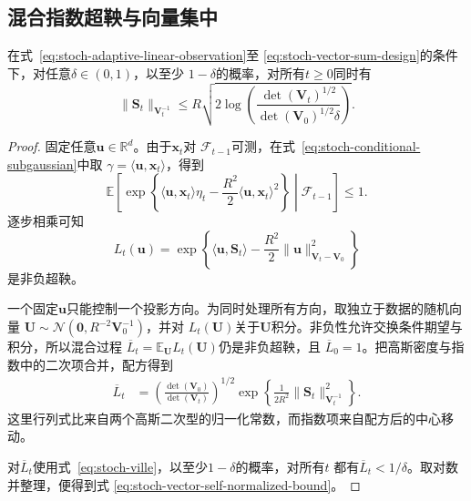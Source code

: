 \subsection{混合指数超鞅与向量集中}

\begin{theorem}[向量自归一化集中界]
  \label{thm:stoch-vector-self-normalized}
  在式~\eqref{eq:stoch-adaptive-linear-observation}至
  \eqref{eq:stoch-vector-sum-design}的条件下，对任意$\delta\in(0,1)$，以至少
  $1-\delta$的概率，对所有$t\geq0$同时有
  \begin{equation}
    \lVert\bm{S}_t\rVert_{\bm{V}_t^{-1}}
    \leq
    R\sqrt{
      2\log\left(
        \frac{\det(\bm{V}_t)^{1/2}}
             {\det(\bm{V}_0)^{1/2}\delta}
      \right)
    }.
    \label{eq:stoch-vector-self-normalized-bound}
  \end{equation}
\end{theorem}

\begin{proof}
固定任意$\bm{u}\in\mathbb{R}^d$。由于$\bm{x}_t$对
$\mathcal{F}_{t-1}$可测，在式~\eqref{eq:stoch-conditional-subgaussian}中取
$\gamma=\langle\bm{u},\bm{x}_t\rangle$，得到
\[
  \mathbb{E}\!\left[
    \exp\left\{
      \langle\bm{u},\bm{x}_t\rangle\eta_t
      -\frac{R^2}{2}
       \langle\bm{u},\bm{x}_t\rangle^2
    \right\}
    \middle|\mathcal{F}_{t-1}
  \right]
  \leq1.
  \]
逐步相乘可知
\[
  L_t(\bm{u})
  =
  \exp\left\{
    \langle\bm{u},\bm{S}_t\rangle
    -\frac{R^2}{2}
     \lVert\bm{u}\rVert_{\bm{V}_t-\bm{V}_0}^2
  \right\}
\]
是非负超鞅。

一个固定$\bm{u}$只能控制一个投影方向。为同时处理所有方向，取独立于数据的随机向量
$\bm{U}\sim\mathcal{N}(\bm{0},R^{-2}\bm{V}_0^{-1})$，并对
$L_t(\bm{U})$关于$\bm{U}$积分。非负性允许交换条件期望与积分，所以混合过程
$\overline L_t=\mathbb{E}_{\bm{U}}L_t(\bm{U})$仍是非负超鞅，且
$\overline L_0=1$。把高斯密度与指数中的二次项合并，配方得到
\begin{align*}
  \overline L_t
  &=
  \left(
    \frac{\det(\bm{V}_0)}
         {\det(\bm{V}_t)}
  \right)^{1/2}
  \exp\left\{
    \frac{1}{2R^2}
    \lVert\bm{S}_t\rVert_{\bm{V}_t^{-1}}^2
  \right\}.
\end{align*}
这里行列式比来自两个高斯二次型的归一化常数，而指数项来自配方后的中心移动。

对$\overline L_t$使用式~\eqref{eq:stoch-ville}，以至少$1-\delta$的概率，对所有$t$
都有$\overline L_t<1/\delta$。取对数并整理，便得到式
\eqref{eq:stoch-vector-self-normalized-bound}。
\end{proof}


